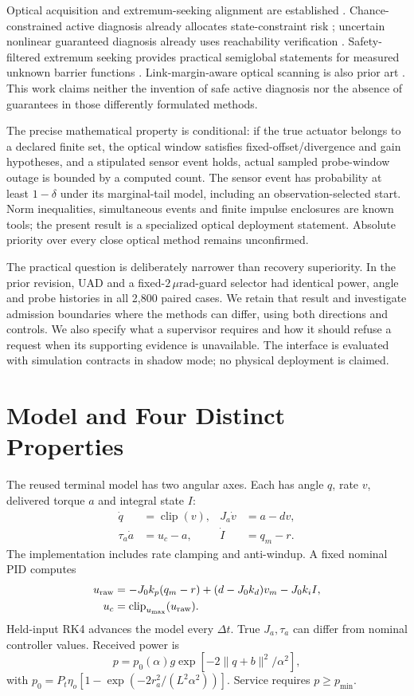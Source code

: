 \documentclass[10pt,journal]{IEEEtran}
\newcommand{\norm}[1]{\lVert#1\rVert}
\newcommand{\um}{\,\mu\mathrm{rad}}
\begin{document}
Optical acquisition and extremum-seeking alignment are established \cite{guelman,es}. Chance-constrained active diagnosis already allocates state-constraint risk \cite{guo}; uncertain nonlinear guaranteed diagnosis already uses reachability verification \cite{massa}. Safety-filtered extremum seeking provides practical semiglobal statements for measured unknown barrier functions \cite{safees}. Link-margin-aware optical scanning is also prior art \cite{yan}. This work claims neither the invention of safe active diagnosis nor the absence of guarantees in those differently formulated methods.

The precise mathematical property is conditional: if the true actuator belongs to a declared finite set, the optical window satisfies fixed-offset/divergence and gain hypotheses, and a stipulated sensor event holds, actual sampled probe-window outage is bounded by a computed count. The sensor event has probability at least $1-\delta$ under its marginal-tail model, including an observation-selected start. Norm inequalities, simultaneous events and finite impulse enclosures are known tools; the present result is a specialized optical deployment statement. Absolute priority over every close optical method remains unconfirmed.

The practical question is deliberately narrower than recovery superiority. In the prior revision, UAD and a fixed-$2\um$-guard selector had identical power, angle and probe histories in all 2,800 paired cases. We retain that result and investigate admission boundaries where the methods can differ, using both directions and controls. We also specify what a supervisor requires and how it should refuse a request when its supporting evidence is unavailable. The interface is evaluated with simulation contracts in shadow mode; no physical deployment is claimed.

\section{Model and Four Distinct Properties}
The reused terminal model \cite{source} has two angular axes. Each has angle $q$, rate $v$, delivered torque $a$ and integral state $I$:
\begin{align}
\dot q&=\operatorname{clip}(v),&J_a\dot v&=a-dv,\nonumber\\
\tau_a\dot a&=u_c-a,&\dot I&=q_m-r.
\end{align}
The implementation includes rate clamping and anti-windup. A fixed nominal PID computes
\begin{align}
u_{\rm raw}&=-J_0k_p(q_m-r)+(d-J_0k_d)v_m-J_0k_iI,\nonumber\\
u_c&=\operatorname{clip}_{u_{\max}}(u_{\rm raw}).
\end{align}
Held-input RK4 advances the model every $\Delta t$. True $J_a,\tau_a$ can differ from nominal controller values. Received power is
\begin{equation}
p=p_0(\alpha)g\exp[-2\norm{q+b}^2/\alpha^2],
\label{eq:optical}
\end{equation}
with $p_0=P_t\eta_o[1-\exp(-2r_a^2/(L^2\alpha^2))]$. Service requires $p\geq p_{\min}$.
\end{document}

